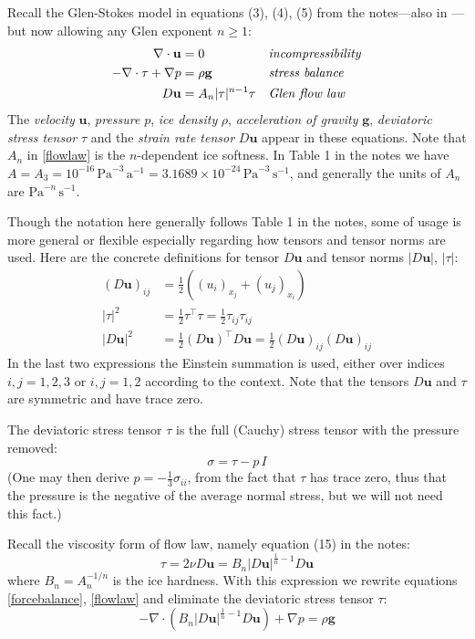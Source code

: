 \documentclass[letterpaper,final,12pt,reqno]{amsart}
\newcommand{\bg}{\mathbf{g}}
\newcommand{\bu}{\mathbf{u}}
\begin{document}
Recall the Glen-Stokes model in equations (3), (4), (5) from the notes---also in \cite{GreveBlatter2009,JouvetRappaz2011}---but now allowing any Glen exponent $n\ge 1$:
\begin{align}
\nabla \cdot \bu &= 0 &&\text{\emph{incompressibility}} \label{incompressible} \\
- \nabla \cdot \tau + \nabla p &= \rho \bg &&\text{\emph{stress balance}} \label{forcebalance} \\
D\bu &= A_n |\tau|^{n-1} \tau &&\text{\emph{Glen flow law}} \label{flowlaw}
\end{align}
The \emph{velocity} $\bu$, \emph{pressure} $p$, \emph{ice density} $\rho$, \emph{acceleration of gravity} $\bg$, \emph{deviatoric stress tensor} $\tau$ and the \emph{strain rate tensor} $D\bu$ appear in these equations.  Note that $A_n$ in \eqref{flowlaw} is the $n$-dependent ice softness.  In Table 1 in the notes we have $A = A_3 = 10^{-16} \,\text{Pa}^{-3}\,\text{a}^{-1} = 3.1689 \times 10^{-24} \,\text{Pa}^{-3}\,\text{s}^{-1}$, and generally the units of $A_n$ are $\text{Pa}^{-n}\,\text{s}^{-1}$.

Though the notation here generally follows Table 1 in the notes, some of usage is more general or flexible especially regarding how tensors and tensor norms are used.  Here are the concrete definitions for tensor $D\bu$ and tensor norms $|D\bu|$, $|\tau|$:
\begin{align*}
(D\bu)_{ij} &= \frac{1}{2} \left((u_i)_{x_j} + (u_j)_{x_i}\right) \\
|\tau|^2 &= \frac{1}{2} \tau^\top \tau = \frac{1}{2} \tau_{ij} \tau_{ij} \\
|D\bu|^2 &= \frac{1}{2} (D\bu)^\top D\bu = \frac{1}{2} (D\bu)_{ij} (D\bu)_{ij}
\end{align*}
In the last two expressions the Einstein summation is used, either over indices $i,j=1,2,3$ or $i,j=1,2$ according to the context.  Note that the tensors $D\bu$ and $\tau$ are symmetric and have trace zero.

The deviatoric stress tensor $\tau$ is the full (Cauchy) stress tensor with the pressure removed:
    $$\sigma = \tau - p\,I$$
(One may then derive $p = -\frac{1}{3} \sigma_{ii}$, from the fact that $\tau$ has trace zero, thus that the pressure is the negative of the average normal stress, but we will not need this fact.)

Recall the viscosity form of flow law, namely equation (15) in the notes:
\begin{equation}
\tau = 2\nu D\bu = B_n |D\bu|^{\frac{1}{n} - 1} D\bu  \label{viscflowlaw}
\end{equation}
where $B_n = A_n^{-1/n}$ is the ice hardness.  With this expression we rewrite equations \eqref{forcebalance}, \eqref{flowlaw} and eliminate the deviatoric stress tensor $\tau$:
\begin{equation}
- \nabla \cdot \left(B_n |D\bu|^{\frac{1}{n} - 1} D\bu\right) + \nabla p = \rho \mathbf{g} \label{stokes}
\end{equation}
\end{document}
